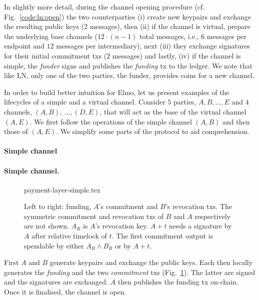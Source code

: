   In slightly more detail, during the channel opening procedure (cf.
  Fig.~\ref{code:ln:open}) the two counterparties (i) create new keypairs and
  exchange the resulting public keys ($2$ messages), then (ii) if the channel is
  virtual, prepare the underlying base channels ($12 \cdot (n-1)$ total
  messages, i.e., $6$ messages per endpoint and $12$ messages
  per intermediary), next (iii) they exchange
  signatures for their initial commitment txs ($2$ messages)
  and lastly, (iv) if the channel is simple, the \emph{funder} signs and
  publishes the \emph{funding} tx to the ledger. We note that like LN,
  only one of the two parties, the funder, provides coins for a new channel.

  In order to build better intuition for Elmo, let us present examples of the
  lifecycles of a simple and a virtual channel. Consider $5$ parties, $A, B,
  \dots, E$ and $4$ channels, $(A, B)$, $\dots,(D, E)$, that will act as
  the base of the virtual channel $(A, E)$. We first follow the operations of
  the simple channel $(A, B)$ and then those of $(A, E)$. We simplify some parts
  of the protocol to aid comprehension.

  \makeatletter%
    {\paragraph{Simple channel}}%
    {\paragraph{Simple channel.}}%
  \makeatother%
  \addtolength{\intextsep}{-15pt}
  \begin{figure}[!htbp]
    \centering
    {payment-layer-simple.tex}
    \caption{Left to right: funding, $A$'s commitment and $B$'s revocation txs.
    The symmetric commitment and
    revocation txs of $B$ and $A$ respectively are not shown.
    $A_R$ is $A$'s revocation key. $A+t$ needs a signature
    by $A$ after relative timelock of $t$. The first commitment output is
    spendable by either $A_R \wedge B_R$ or by $A + t$.}%
    \label{figure:payment-layer-simple}
  \end{figure}
  \addtolength{\intextsep}{15pt}

  First $A$ and $B$ generate keypairs and exchange the public keys. Each then
  locally generates the \emph{funding} and the two \emph{commitment} txs
  (Fig.~\ref{figure:payment-layer-simple}). The latter are signed and the
  signatures are exchanged. $A$ then publishes the funding tx on-chain. Once it
  is finalised, the channel is open.

